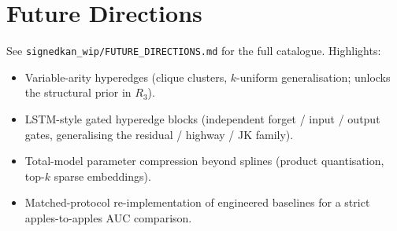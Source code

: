 \documentclass[11pt, a4paper]{article}
\begin{document}
\section{Future Directions}

See \texttt{signedkan\_wip/FUTURE\_DIRECTIONS.md} for the full
catalogue. Highlights:
\begin{itemize}
\item Variable-arity hyperedges (clique clusters, $k$-uniform
  generalisation; unlocks the structural prior in $R_3$).
\item LSTM-style gated hyperedge blocks (independent forget /
  input / output gates, generalising the residual / highway / JK
  family).
\item Total-model parameter compression beyond splines (product
  quantisation, top-$k$ sparse embeddings).
\item Matched-protocol re-implementation of engineered baselines
  for a strict apples-to-apples AUC comparison.
\end{itemize}
\end{document}
